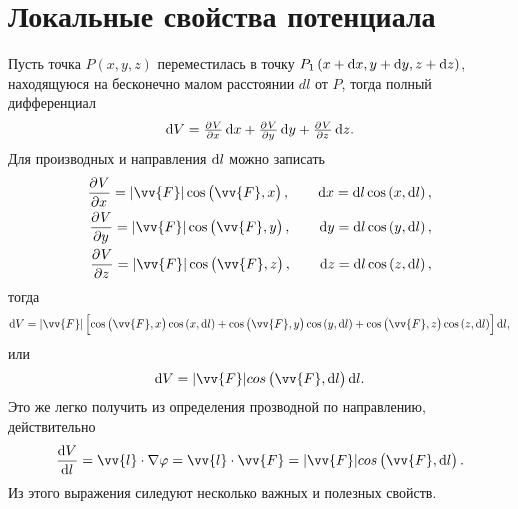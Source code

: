 \documentclass[11pt, a4paper]{article}
\theoremstyle{plain}
\theoremstyle{definition}
\theoremstyle{remark}
\renewcommand{\phi}{\ensuremath{\varphi}}
\begin{document}
\section{Локальные свойства потенциала}
Пусть точка $P\left( x,y,z \right)$ переместилась в точку $P_1\left( x + \dif x, y + \dif y, z +
\dif z \right)$, находящуюся на бесконечно малом расстоянии $dl$ от $P$, тогда полный дифференциал
\begin{equation*}
    \dif V = \pd{V}{x}\dif x + \pd{V}{y}\dif y + \pd{V}{z}\dif z.
\end{equation*}
Для производных и направления $\dif l$ можно записать
\begin{align*}
    \dpd{V}{x} = |\vv{F}|\cos\left( \vv{F}, x \right),\qquad \dif x = \dif l\cos\left( x, \dif l
    \right),\\
    \dpd{V}{y} = |\vv{F}|\cos\left( \vv{F}, y \right),\qquad \dif y = \dif l\cos\left( y, \dif l
    \right),\\
    \dpd{V}{z} = |\vv{F}|\cos\left( \vv{F}, z \right),\qquad \dif z = \dif l\cos\left( z, \dif l
    \right),
\end{align*}
тогда
\begin{equation*}
    \dif V = |\vv{F}|\left[
        \cos\left( \vv{F}, x \right)\cos\left( x, \dif l \right) +
        \cos\left( \vv{F}, y \right)\cos\left( y, \dif l \right) +
    \cos\left( \vv{F}, z \right)\cos\left( z, \dif l \right) \right]\dif l,
\end{equation*}
или
\begin{equation*}
    \dif V = |\vv{F}|cos\left( \vv{F}, \dif l \right)\dif l.
\end{equation*}
Это же легко получить из определения прозводной по направлению, действительно
\begin{equation*}
    \dfrac{\dif V}{\dif l} = \vv{l} \cdot \nabla \phi = \vv{l} \cdot \vv{F} = |\vv{F}|cos\left( \vv{F}, \dif l \right).
\end{equation*}
Из этого выражения силедуют несколько важных и полезных свойств.
\end{document}
